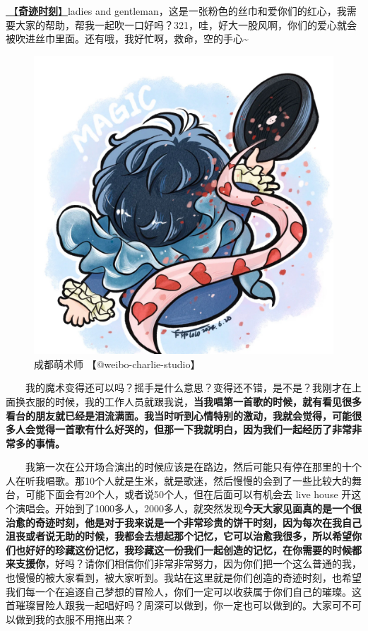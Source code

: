 \documentclass[]{ctexbook}
\begin{document}
\hyperref[magic-moment]{🎵【\textbf{奇迹时刻}】}ladies and gentleman，这是一张粉色的丝巾和爱你们的红心，我需要大家的帮助，帮我一起吹一口好吗？321，哇，好大一股风啊，你们的爱心就会被吹进丝巾里面。还有哦，我好忙啊，救命，空的手心\textasciitilde{}

\begin{figure}

{\centering \includegraphics[width=440pt]{img/chengdu20240615/001} 

}

\caption{成都萌术师 【@weibo-charlie-studio】}\label{fig:unnamed-chunk-53}
\end{figure}

  我的魔术变得还可以吗？摇手是什么意思？变得还不错，是不是？我刚才在上面换衣服的时候，我的工作人员就跟我说，\textbf{当我唱第一首歌的时候，就有看见很多看台的朋友就已经是泪流满面。我当时听到心情特别的激动，我就会觉得，可能很多人会觉得一首歌有什么好哭的，但那一下我就明白，因为我们一起经历了非常非常多的事情。}

  我第一次在公开场合演出的时候应该是在路边，然后可能只有停在那里的十个人在听我唱歌。那10个人就是生米，就是歌迷，然后慢慢的会到了一些比较大的舞台，可能下面会有20个人，或者说50个人，但在后面可以有机会去 live house 开这个演唱会。开始到了1000多人，2000多人，就突然发现\textbf{今天大家见面真的是一个很治愈的奇迹时刻，他是对于我来说是一个非常珍贵的饼干时刻，因为每次在我自己沮丧或者说无助的时候，我都会去想起那个记忆，它可以治愈我很多，所以希望你们也好好的珍藏这份记忆，我珍藏这一份我们一起创造的记忆，在你需要的时候都来支援你}，好吗？请你们相信你们非常非常努力，因为你们把一个这么普通的我，也慢慢的被大家看到，被大家听到。我站在这里就是你们创造的奇迹时刻，也希望我们每一个在追逐自己梦想的冒险人，你们一定可以收获属于你们自己的璀璨。这首璀璨冒险人跟我一起唱好吗？周深可以做到，你一定也可以做到的。大家可不可以做到我的衣服不用拖出来？
\end{document}
